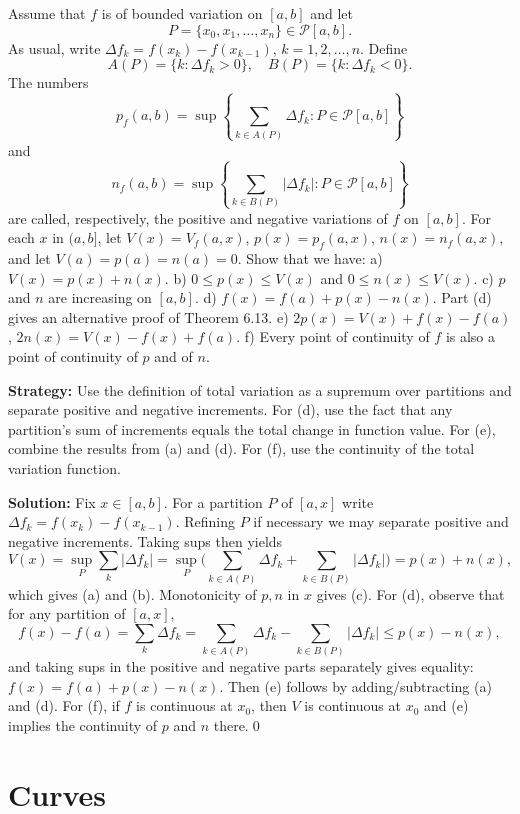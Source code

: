 \begin{problembox}
Assume that $f$ is of bounded variation on $[a, b]$ and let
\[P = \{x_0, x_1, \ldots, x_n\} \in \mathcal{P}[a, b].\]
As usual, write $\Delta f_k = f(x_k) - f(x_{k-1})$, $k = 1, 2, \ldots, n$. Define
\[A(P) = \{k : \Delta f_k > 0\}, \quad B(P) = \{k : \Delta f_k < 0\}.\]
The numbers
\[p_f(a, b) = \sup \left\{ \sum_{k \in A(P)} \Delta f_k : P \in \mathcal{P}[a, b] \right\}\]
and
\[n_f(a, b) = \sup \left\{ \sum_{k \in B(P)} |\Delta f_k| : P \in \mathcal{P}[a, b] \right\}\]
are called, respectively, the positive and negative variations of $f$ on $[a, b]$. For each $x$ in $(a, b]$, let $V(x) = V_f(a, x)$, $p(x) = p_f(a, x)$, $n(x) = n_f(a, x)$, and let $V(a) = p(a) = n(a) = 0$. Show that we have:
a) $V(x) = p(x) + n(x)$.
b) $0 \leq p(x) \leq V(x)$ and $0 \leq n(x) \leq V(x)$.
c) $p$ and $n$ are increasing on $[a, b]$.
d) $f(x) = f(a) + p(x) - n(x)$. Part (d) gives an alternative proof of Theorem 6.13.
e) $2p(x) = V(x) + f(x) - f(a)$, $2n(x) = V(x) - f(x) + f(a)$.
f) Every point of continuity of $f$ is also a point of continuity of $p$ and of $n$.
\end{problembox}

\noindent\textbf{Strategy:} Use the definition of total variation as a supremum over partitions and separate positive and negative increments. For (d), use the fact that any partition's sum of increments equals the total change in function value. For (e), combine the results from (a) and (d). For (f), use the continuity of the total variation function.

\bigskip\noindent\textbf{Solution:}
Fix $x\in[a,b]$. For a partition $P$ of $[a,x]$ write $\Delta f_k=f(x_k)-f(x_{k-1})$. Refining $P$ if necessary we may separate positive and negative increments. Taking sups then yields
\[V(x)=\sup_P\sum_k |\Delta f_k|=\sup_P\Big(\sum_{k\in A(P)}\!\Delta f_k+\sum_{k\in B(P)}\!|\Delta f_k|\Big)=p(x)+n(x),\]
which gives (a) and (b). Monotonicity of $p,n$ in $x$ gives (c). For (d), observe that for any partition of $[a,x]$,
\[f(x)-f(a)=\sum_k \Delta f_k=\sum_{k\in A(P)}\!\Delta f_k-\sum_{k\in B(P)}\!|\Delta f_k|\le p(x)-n(x),\]
and taking sups in the positive and negative parts separately gives equality: $f(x)=f(a)+p(x)-n(x)$. Then (e) follows by adding/subtracting (a) and (d). For (f), if $f$ is continuous at $x_0$, then $V$ is continuous at $x_0$ and (e) implies the continuity of $p$ and $n$ there.\qed
\section{Curves}



